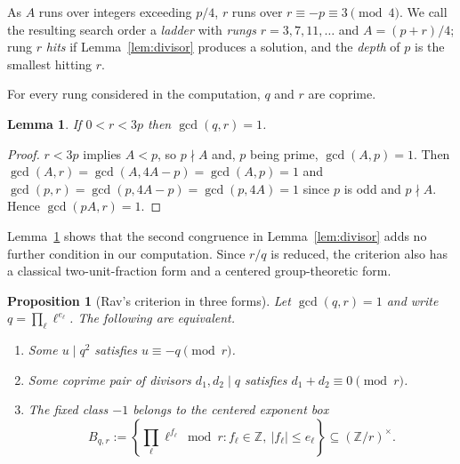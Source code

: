 \documentclass[11pt]{article}
\newtheorem{lemma}[theorem]{Lemma}
\newtheorem{proposition}[theorem]{Proposition}
\theoremstyle{definition}
\theoremstyle{remark}
\begin{document}
As $A$ runs over integers exceeding $p/4$, $r$ runs over $r \equiv -p \equiv 3 \pmod 4$.
We call the resulting search order a \emph{ladder} with \emph{rungs}
$r = 3, 7, 11, \dots$ and $A = (p+r)/4$; rung $r$ \emph{hits} if
Lemma~\ref{lem:divisor} produces a solution, and the \emph{depth} of $p$ is the
smallest hitting $r$.

For every rung considered in the computation, $q$ and $r$ are coprime.

\begin{lemma}\label{lem:coprime}
If $0 < r < 3p$ then $\gcd(q, r) = 1$.
\end{lemma}

\begin{proof}
$r < 3p$ implies $A < p$, so $p \nmid A$ and, $p$ being prime,
$\gcd(A,p) = 1$. Then $\gcd(A, r) = \gcd(A, 4A - p) = \gcd(A, p) = 1$ and
$\gcd(p, r) = \gcd(p, 4A - p) = \gcd(p, 4A) = 1$ since $p$ is odd and $p \nmid A$.
Hence $\gcd(pA, r) = 1$.
\end{proof}

Lemma~\ref{lem:coprime} shows that the second congruence in
Lemma~\ref{lem:divisor} adds no further condition in our computation. Since $r/q$ is
reduced, the criterion also has a classical
two-unit-fraction form and a centered group-theoretic form.

\begin{proposition}[Rav's criterion in three forms]\label{prop:rav}
Let $\gcd(q,r)=1$ and write $q=\prod_\ell \ell^{e_\ell}$. The following are
equivalent.
\begin{enumerate}
\item Some $u\mid q^2$ satisfies $u\equiv-q\pmod r$.
\item Some coprime pair of divisors $d_1,d_2\mid q$ satisfies
$d_1+d_2\equiv0\pmod r$.
\item The fixed class $-1$ belongs to the centered exponent box
\begin{equation}\label{eq:exponent-box}
B_{q,r}:=\left\{\prod_\ell \ell^{f_\ell}\bmod r:
f_\ell\in\mathbb Z,\ |f_\ell|\le e_\ell\right\}
\subseteq(\mathbb Z/r)^\times .
\end{equation}
\end{enumerate}
\end{proposition}
\end{document}
